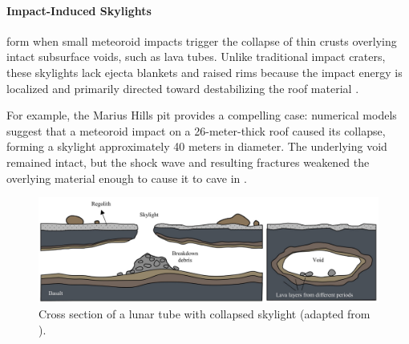 \paragraph{Impact-Induced Skylights}form when small meteoroid impacts trigger the collapse of thin crusts overlying intact subsurface voids, such as lava tubes. Unlike traditional impact craters, these skylights lack ejecta blankets and raised rims because the impact energy is localized and primarily directed toward destabilizing the roof material \cite{lunar-pits-numerical-modelling}.

For example, the Marius Hills pit provides a compelling case: numerical models suggest that a meteoroid impact on a 26-meter-thick roof caused its collapse, forming a skylight approximately 40 meters in diameter. The underlying void remained intact, but the shock wave and resulting fractures weakened the overlying material enough to cause it to cave in \cite{clrn-impact-melt}.

\begin{figure}[H]
    \centering
    \includegraphics[width=0.99\linewidth]{lunar-pit-in-lava-tube.png}
    \caption{Cross section of a lunar tube with collapsed skylight (adapted from    \cite{bases-feng}).}
    \label{fig:impact-induced-skylight}
\end{figure}
